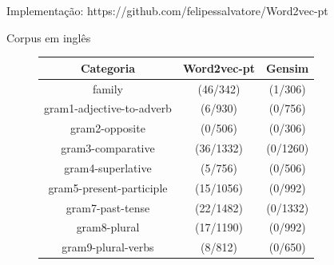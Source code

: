 \documentclass{beamer}
\begin{document}
\begin{frame}[fragile]{Implementação: https://github.com/felipessalvatore/Word2vec-pt}


\begin{center}
\small{Corpus em inglês}
\end{center}

\small{
\begin{figure}
\begin{center}
\begin{tabular}{|c|c|c|}
\hline
\cellcolor{blue!40}Categoria & \cellcolor{blue!40}Word2vec-pt & \cellcolor{blue!40}Gensim  \\ \hline
\cellcolor{blue!10}family &  \cellcolor{green!20}(46/342) & \cellcolor{green!20}(1/306) \\ \hline
\cellcolor{blue!10}gram1-adjective-to-adverb &  \cellcolor{green!20}(6/930) & \cellcolor{green!20}(0/756)  \\ \hline
\cellcolor{blue!10}gram2-opposite &  \cellcolor{green!20}(0/506) &\cellcolor{green!20}(0/306) \\ \hline
\cellcolor{blue!10}gram3-comparative &  \cellcolor{green!20}(36/1332) & \cellcolor{green!20}(0/1260)\\ \hline
\cellcolor{blue!10}gram4-superlative &  \cellcolor{green!20}(5/756) & \cellcolor{green!20}(0/506) \\ \hline
\cellcolor{blue!10}gram5-present-participle & \cellcolor{green!20} (15/1056) & \cellcolor{green!20}(0/992) \\ \hline
\cellcolor{blue!10}gram7-past-tense &  \cellcolor{green!20}(22/1482) & \cellcolor{green!20}(0/1332) \\ \hline
\cellcolor{blue!10}gram8-plural & \cellcolor{green!20} (17/1190) &\cellcolor{green!20} (0/992) \\ \hline
\cellcolor{blue!10}gram9-plural-verbs &  \cellcolor{green!20}(8/812) & \cellcolor{green!20}(0/650)
\end{tabular}
\end{center}
\end{figure}
}
\end{frame}
\end{document}
